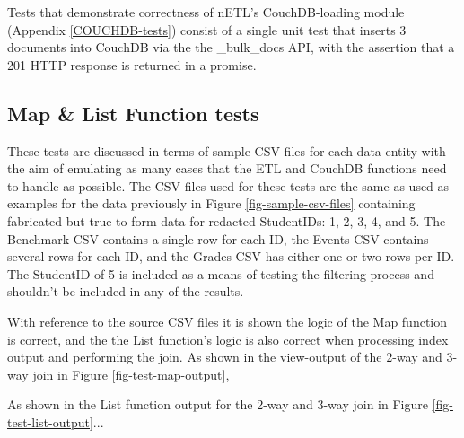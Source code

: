 Tests that demonstrate correctness of nETL's CouchDB-loading module (Appendix \ref{COUCHDB-tests}) consist of a single unit test that inserts 3 documents into CouchDB via the the \_bulk\_docs API, with the assertion that a 201 HTTP response is returned in a promise.

\subsection{Map \& List Function tests}
These tests are discussed in terms of sample CSV files for each data entity with the aim of emulating as many cases that the ETL and CouchDB functions need to handle as possible. The CSV files used for these tests are the same as used as examples for the data previously in Figure \ref{fig-sample-csv-files} containing fabricated-but-true-to-form data for redacted StudentIDs: 1, 2, 3, 4, and 5. The Benchmark CSV contains a single row for each ID, the Events CSV contains several rows for each ID, and the Grades CSV has either one or two rows per ID. The StudentID of 5 is included as a means of testing the filtering process and shouldn't be included in any of the results.

With reference to the source CSV files it is shown the logic of the Map function is correct, and the the List function's logic is also correct when processing index output and performing the join. As shown in the view-output of the 2-way and 3-way join in Figure \ref{fig-test-map-output},

As shown in the List function output for the 2-way and 3-way join in Figure \ref{fig-test-list-output}...

\newpage

\newpage

\newpage